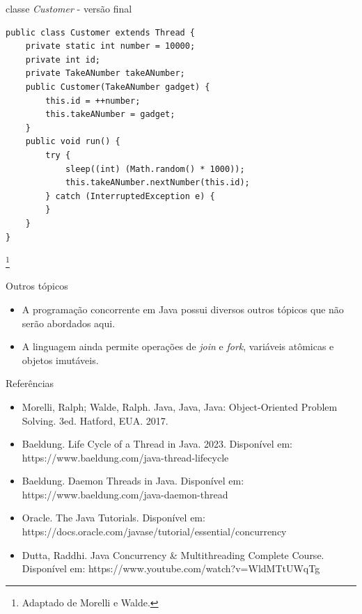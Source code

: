 \documentclass[11pt,justified]{beamer}
\newcommand\blfootnote[1]{%
  \begingroup
  \renewcommand\thefootnote{}\footnote{#1}%
  \addtocounter{footnote}{-1}%
  \endgroup
}
\begin{document}
\begin{frame}[fragile]{classe \textit{Customer} - versão final}
    \begin{lstlisting}
public class Customer extends Thread {
    private static int number = 10000;
    private int id;
    private TakeANumber takeANumber;
    public Customer(TakeANumber gadget) {
        this.id = ++number;
        this.takeANumber = gadget;
    }
    public void run() {
        try {
            sleep((int) (Math.random() * 1000));
            this.takeANumber.nextNumber(this.id);
        } catch (InterruptedException e) {
        }
    }
}
    \end{lstlisting}\blfootnote{Adaptado de Morelli e Walde.}
\end{frame}

\begin{frame}{Outros tópicos}
    \begin{itemize}
        \item A programação concorrente em Java possui diversos outros tópicos que não serão abordados aqui.
        \item A linguagem ainda permite operações de \textit{join} e \textit{fork}, variáveis atômicas e objetos imutáveis.
    \end{itemize}
\end{frame}

\begin{frame}{Referências}
    \begin{itemize}
        \item Morelli, Ralph; Walde, Ralph. Java, Java, Java: Object-Oriented Problem Solving. 3ed. Hatford, EUA. 2017.
        \item Baeldung. Life Cycle of a Thread in Java. 2023. Disponível em: https://www.baeldung.com/java-thread-lifecycle
        \item Baeldung. Daemon Threads in Java. Disponível em: https://www.baeldung.com/java-daemon-thread
        \item Oracle. The Java Tutorials. Disponível em: https://docs.oracle.com/javase/tutorial/essential/concurrency
        \item Dutta, Raddhi. Java Concurrency \& Multithreading Complete Course. Disponível em: https://www.youtube.com/watch?v=WldMTtUWqTg
    \end{itemize}
\end{frame}
\end{document}
